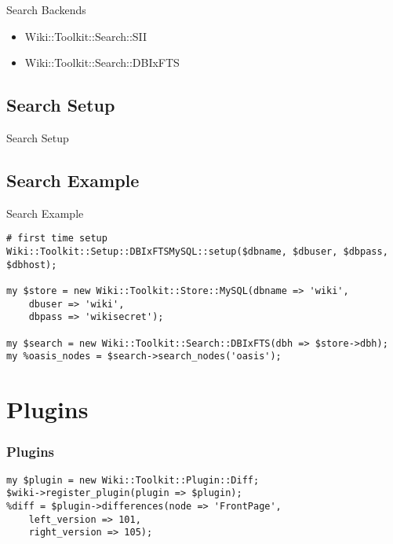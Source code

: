 \begin{frame}{Search Backends}
 \begin{itemize}
  \item Wiki::Toolkit::Search::SII
  \item Wiki::Toolkit::Search::DBIxFTS
 \end{itemize}
\end{frame}

\subsection{Search Setup}

\begin{frame}[fragile]{Search Setup}

\end{frame}

\subsection{Search Example}


\begin{frame}[fragile]{Search Example}
\begin{lstlisting}
# first time setup
Wiki::Toolkit::Setup::DBIxFTSMySQL::setup($dbname, $dbuser, $dbpass, $dbhost);

my $store = new Wiki::Toolkit::Store::MySQL(dbname => 'wiki',
    dbuser => 'wiki',
    dbpass => 'wikisecret');

my $search = new Wiki::Toolkit::Search::DBIxFTS(dbh => $store->dbh);
my %oasis_nodes = $search->search_nodes('oasis');
\end{lstlisting}
\end{frame}

\section{Plugins}


\begin{frame}[fragile]
\frametitle{Plugins}
\begin{lstlisting}
my $plugin = new Wiki::Toolkit::Plugin::Diff;
$wiki->register_plugin(plugin => $plugin);
%diff = $plugin->differences(node => 'FrontPage',
    left_version => 101,
    right_version => 105);
\end{lstlisting}
\end{frame}

